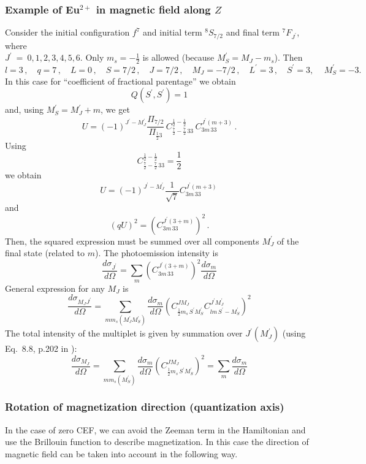 \documentclass[a4paper,oneside,12pt]{extarticle}
\begin{document}
\subsubsection {Example of Eu$^{2+}$ in magnetic field along $Z$}
Consider the initial configuration $f^7$ and initial term $^8S_{7/2}$
and final term $^7F_{J^{\prime}}$, where \\
$J^{\prime}~=~0,1,2,3,4,5,6$.
Only $m_s=-\frac{1}{2}$ is allowed (because $M_S^{\prime}=M_J-m_s$). Then
%
$$
l=3 \,, \quad q=7 \,, \quad L=0 \,, \quad S=7/2 \,, \quad J=7/2 \,, \quad
M_J=-7/2 \,, \quad L^{\prime}=3 \,, \quad S^{\prime}=3, \, \quad M_S^{\prime}=-3.
$$
In this case for ``coefficient of fractional parentage'' we obtain
$$
Q(S^{\prime}, S^{\prime}) =1
$$
%
and, using $M_S^{\prime}=M_J^{\prime}+m$, we get
$$
U= (-1)^{J^{\prime}-M_J^{\prime}} \frac{\Pi_{7/2}}{\Pi_{\frac{1}{2}3}} \,
C^{\frac{1}{2} -\frac{1}{2}}_{\frac{7}{2} -\frac{7}{2} \, 3 3} \,
C^{J^{\prime} (m+3)}_{3 m \, 33} \, .
$$
Using
$$
 C^{\frac{1}{2} -\frac{1}{2}}_{\frac{7}{2} -\frac{7}{2} \, 3 3} = \frac{1}{2}
$$
we obtain
$$
U= (-1)^{J^{\prime}-M_J^{\prime}} \frac{1}{\sqrt{7}} C^{J^{\prime} (m+3)}_{3 m \, 33} \,
$$
and 
$$
(q U)^2= \left( C^{J^{\prime} (3+m)}_{3 m \, 33} \right)^2 \,.
$$
Then, the squared expression must be summed over all components $M_J^{\prime}$ of the final state (related to $m$). The photoemission intensity is 
%
$$
\frac{d \sigma_{J^{\prime}}}{d \Omega} = \sum_{m}
\left( C^{J^{\prime} (3+m)}_{3 m \, 33} \right)^2 \frac{d \sigma_{m}}{d \Omega}
$$
%
General expression for any $M_J$ is
$$
\frac{d \sigma_{M_J J^{\prime}}}{d \Omega} = \sum_{m m_s (M_J^\prime M_S^\prime)} \frac{d \sigma_{m}}{d \Omega} \left(
C_{\frac{1}{2} m_s\, S^\prime M_S^\prime}^{J M_J} 
C_{l m\, S^\prime -M_S^\prime}^{J^\prime M_J^\prime}
\right)^2
$$
%
The total intensity of the multiplet is given by summation over $J^{\prime}(M_J^\prime)$ (using Eq.~8.8, p.202 in \cite{Varshalovich}):
%
$$
\frac{d \sigma_{M_J}}{d \Omega} = \sum_{m m_s (M_S^\prime)} \frac{d \sigma_{m}}{d \Omega} \left(
C_{\frac{1}{2} m_s\, S^\prime M_S^\prime}^{J M_J} \right)^2 = 
\sum_{m} \frac{d \sigma_{m}}{d \Omega}
$$

\subsubsection {Rotation of magnetization direction (quantization axis)}
In the case of zero CEF, we can avoid the Zeeman term in the Hamiltonian and use the Brillouin function to describe magnetization. In this case the direction of magnetic field can be taken into account in the following way.
\end{document}
